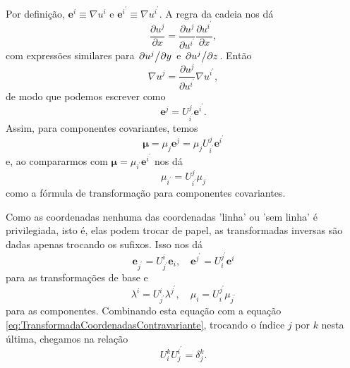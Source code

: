 Por definição, $\mathbf{e}^{i} \equiv \nabla u^{i} \text { e } \mathbf{e}^{i^{\prime}} \equiv \nabla u^{i^{\prime}}$. A regra da cadeia nos dá
\[
	\frac{\partial u^{j}}{\partial x}=\frac{\partial u^{j}}{\partial u^{i^{\prime}}} \frac{\partial u^{i^{\prime}}}{\partial x},
\]
com expressões similares para $\pdv*{u^j}{y}$ e $\pdv*{u^j}{z}$. Então
\[
	\nabla u^{j}=\frac{\partial u^{j}}{\partial u^{i^{\prime}}} \nabla u^{i^{\prime}},
\]
de modo que podemos escrever como
\begin{equation}\label{eq:TransformadaCovarianteBase}
	\mathbf{e}^{j} = U^{j}_{i^\prime} \mathbf{e}^{i^\prime}.
\end{equation}
Assim, para componentes covariantes, temos
\[
	\boldsymbol{\mu}=\mu_{j} \mathbf{e}^{j}=\mu_{j} U_{i^{\prime}}^{j} \mathbf{e}^{i^{\prime}}
\]
e, ao compararmos com $\mathbf{\mu}=\mu_{i^\prime}\mathbf{e}^{i^\prime}$ nos dá
\begin{equation}\label{eq:TransformadaCoordenadasCovariante}
	\boxed{
		\mu_{i^\prime} = U^{j}_{i^\prime} \mu_j
	}
\end{equation}
como a fórmula de transformação para componentes covariantes.

Como as coordenadas nenhuma das coordenadas 'linha' ou 'sem linha' é privilegiada, isto é, elas podem trocar de papel, as transformadas inversas são dadas apenas trocando os sufixos. Isso nos dá
\begin{equation}\label{eq:TransformadasBaseInversa}
	\mathbf{e}_{j^{\prime}}=U_{j^{\prime}}^{i} \mathbf{e}_{i}, \quad \mathbf{e}^{j^{\prime}}=U_{i}^{j^{\prime}} \mathbf{e}^{i} 
\end{equation}
para as transformações de base e
\begin{equation}\label{eq:TransformadasCoordenadasInversas}
	\lambda^{i}=U_{j^{\prime}}^{i} \lambda^{j^{\prime}}, \quad \mu_{i}=U_{i}^{j^{\prime}} \mu_{j^{\prime}}
\end{equation}
para as componentes. Combinando esta equação com a equação \eqref{eq:TransformadaCoordenadasContravariante}, trocando o índice $j$ por $k$ nesta última, chegamos na relação
\begin{equation}
	\boxed{
		U_{i}^{k} U_{j}^{i^{\prime}}=\delta_{j}^{k} .
	}
\end{equation}

